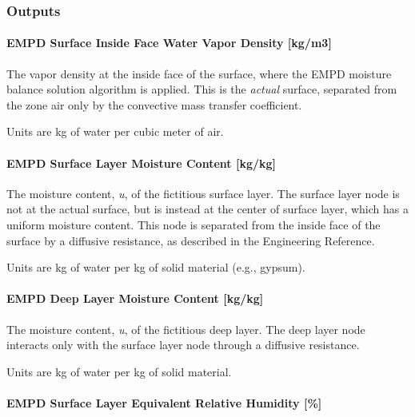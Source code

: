 \subsubsection{Outputs}\label{moisture-penetration-depth-empd-outputs}

\paragraph{EMPD Surface Inside Face Water Vapor Density {[}kg/m3{]}}\label{empd-surface-inside-face-water-vapor-density-kgm3}

The vapor density at the inside face of the surface, where the EMPD moisture balance solution algorithm is applied. This is the \emph{actual} surface, separated from the zone air only by the convective mass transfer coefficient.

Units are kg of water per cubic meter of air.

\paragraph{EMPD Surface Layer Moisture Content {[}kg/kg{]}}\label{empd-surface-layer-moisture-content-kgkg}

The moisture content, \emph{u}, of the fictitious surface layer. The surface layer node is not at the actual surface, but is instead at the center of surface layer, which has a uniform moisture content. This node is separated from the inside face of the surface by a diffusive resistance, as described in the Engineering Reference.

Units are kg of water per kg of solid material (e.g., gypsum).

\paragraph{EMPD Deep Layer Moisture Content
	{[}kg/kg{]}}\label{empd-deep-layer-moisture-content-kgkg}

The moisture content, \emph{u}, of the fictitious deep layer. The deep layer node interacts only with the surface layer node through a diffusive resistance.

Units are kg of water per kg of solid material.

\paragraph{EMPD Surface Layer Equivalent Relative Humidity {[}\%{]}}\label{empd-surface-layer-equivalent-relative-humidity}

